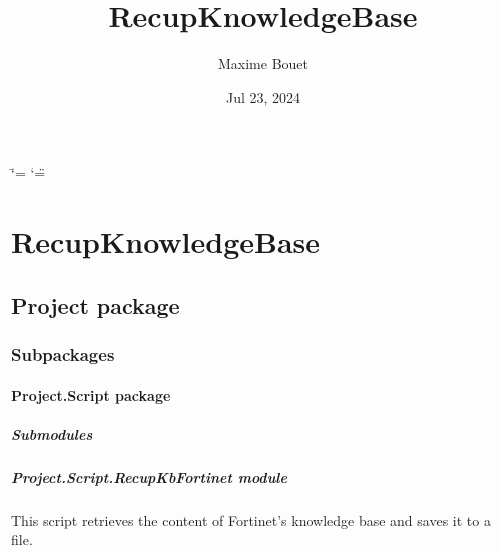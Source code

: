 \documentclass[letterpaper,10pt,english]{sphinxmanual}
\title{RecupKnowledgeBase}
\date{Jul 23, 2024}
\author{Maxime Bouet}
\begin{document}
\ifdefined\shorthandoff
  \ifnum\catcode`\=\string=\active\shorthandoff{=}\fi
  \ifnum\catcode`\"=\active{}\fi
\fi

\pagestyle{empty}
\sphinxmaketitle
\pagestyle{plain}
\sphinxtableofcontents
\pagestyle{normal}
\label{\detokenize{index::doc}}


\sphinxstepscope


\chapter{RecupKnowledgeBase}
\label{\detokenize{modules:recupknowledgebase}}\label{\detokenize{modules::doc}}
\sphinxstepscope


\section{Project package}
\label{\detokenize{Project:project-package}}\label{\detokenize{Project::doc}}

\subsection{Subpackages}
\label{\detokenize{Project:subpackages}}
\sphinxstepscope


\subsubsection{Project.Script package}
\label{\detokenize{Project.Script:project-script-package}}\label{\detokenize{Project.Script::doc}}

\paragraph{Submodules}
\label{\detokenize{Project.Script:submodules}}

\paragraph{Project.Script.RecupKbFortinet module}
\label{\detokenize{Project.Script:module-Project.Script.RecupKbFortinet}}\label{\detokenize{Project.Script:project-script-recupkbfortinet-module}}
\sphinxAtStartPar
This script retrieves the content of Fortinet’s knowledge base and saves it to a file.
\end{document}
